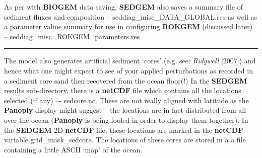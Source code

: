 As per with \textbf{BIOGEM} data saving, \textbf{SEDGEM} also saves a summary file of sediment fluxes and composition -- \textsf{\footnotesize seddiag\_misc\_DATA\_GLOBAL.res} as well as a parameter valiue summary for use in configuring \textbf{ROKGEM} (discussed later) -- \textsf{\footnotesize seddiag\_misc\_ROKGEM\_parameters.res}

\vspace{1mm}
\noindent\rule{4cm}{0.1mm}
\vspace{2mm}

\noindent The model also generates artificial sediment ‘cores’ (e.g. see: \textit{Ridgwell} [2007]) and hence what one might expect to see of your applied perturbations as recorded in a sediment core sand then recovered from the ocean floor(!) In the \textbf{SEDGEM} results sub-directory, there is a \textbf{netCDF} file which contains all the locations selected (if any) –- \textsf{\footnotesize sedcore.nc}. These are not really aligned with latitude as the \textbf{Panoply} display might suggest – the locations are in fact distributed from all over the ocean (\textbf{Panoply} is being fooled in order to display them together). In the \textbf{SEDGEM} 2D \textbf{netCDF} file, these locations are marked in the \textbf{netCDF} variable \textsf{\footnotesize grid\_mask\_sedcore}. The locations of these cores are stored in a a file containing a little ASCII ‘map’ of the ocean.
\vspace{1mm}

